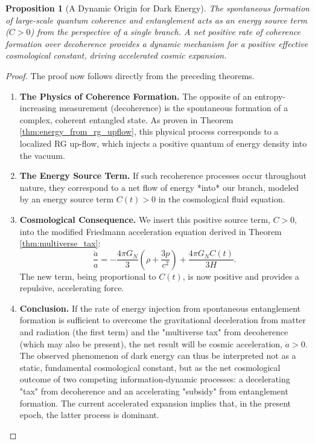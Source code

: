 \documentclass[11pt, letterpaper]{report}
\theoremstyle{plain} %
\newtheorem{proposition}[theorem]{Proposition}
\theoremstyle{definition} %
\theoremstyle{remark} %
\begin{document}
\begin{proposition}[A Dynamic Origin for Dark Energy]
\label{prop:explore_dark_energy_revised}
The spontaneous formation of large-scale quantum coherence and entanglement acts as an energy source term ($C > 0$) from the perspective of a single branch. A net positive rate of coherence formation over decoherence provides a dynamic mechanism for a positive effective cosmological constant, driving accelerated cosmic expansion.
\end{proposition}
\begin{proof}
The proof now follows directly from the preceding theorems.
\begin{enumerate}
    \item \textbf{The Physics of Coherence Formation.} The opposite of an entropy-increasing measurement (decoherence) is the spontaneous formation of a complex, coherent entangled state. As proven in Theorem \ref{thm:energy_from_rg_upflow}, this physical process corresponds to a localized RG up-flow, which injects a positive quantum of energy density into the vacuum.

    \item \textbf{The Energy Source Term.} If such recoherence processes occur throughout nature, they correspond to a net flow of energy *into* our branch, modeled by an energy source term $C(t) > 0$ in the cosmological fluid equation.

    \item \textbf{Cosmological Consequence.} We insert this positive source term, $C > 0$, into the modified Friedmann acceleration equation derived in Theorem \ref{thm:multiverse_tax}:
    \begin{equation}
        \frac{\ddot{a}}{a} = -\frac{4\pi G_N}{3}\left(\rho + \frac{3p}{c^2}\right) + \frac{4\pi G_N C(t)}{3H}.
    \end{equation}
    The new term, being proportional to $C(t)$, is now positive and provides a repulsive, accelerating force.

    \item \textbf{Conclusion.} If the rate of energy injection from spontaneous entanglement formation is sufficient to overcome the gravitational deceleration from matter and radiation (the first term) and the "multiverse tax" from decoherence (which may also be present), the net result will be cosmic acceleration, $\ddot{a} > 0$. The observed phenomenon of dark energy can thus be interpreted not as a static, fundamental cosmological constant, but as the net cosmological outcome of two competing information-dynamic processes: a decelerating "tax" from decoherence and an accelerating "subsidy" from entanglement formation. The current accelerated expansion implies that, in the present epoch, the latter process is dominant.
\end{enumerate}
\end{proof}
\end{document}
